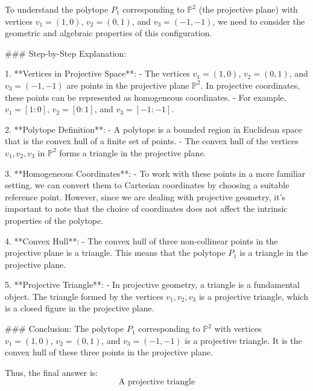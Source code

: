 To understand the polytope \( P_1 \) corresponding to \(\mathbb{P}^2\) (the projective plane) with vertices \( v_1 = (1,0) \), \( v_2 = (0,1) \), and \( v_3 = (-1,-1) \), we need to consider the geometric and algebraic properties of this configuration.

### Step-by-Step Explanation:

1. **Vertices in Projective Space**:
   - The vertices \( v_1 = (1,0) \), \( v_2 = (0,1) \), and \( v_3 = (-1,-1) \) are points in the projective plane \(\mathbb{P}^2\). In projective coordinates, these points can be represented as homogeneous coordinates.
   - For example, \( v_1 = [1:0] \), \( v_2 = [0:1] \), and \( v_3 = [-1:-1] \).

2. **Polytope Definition**:
   - A polytope is a bounded region in Euclidean space that is the convex hull of a finite set of points.
   - The convex hull of the vertices \( v_1, v_2, v_3 \) in \(\mathbb{P}^2\) forms a triangle in the projective plane.

3. **Homogeneous Coordinates**:
   - To work with these points in a more familiar setting, we can convert them to Cartesian coordinates by choosing a suitable reference point. However, since we are dealing with projective geometry, it's important to note that the choice of coordinates does not affect the intrinsic properties of the polytope.

4. **Convex Hull**:
   - The convex hull of three non-collinear points in the projective plane is a triangle. This means that the polytope \( P_1 \) is a triangle in the projective plane.

5. **Projective Triangle**:
   - In projective geometry, a triangle is a fundamental object. The triangle formed by the vertices \( v_1, v_2, v_3 \) is a projective triangle, which is a closed figure in the projective plane.

### Conclusion:
The polytope \( P_1 \) corresponding to \(\mathbb{P}^2\) with vertices \( v_1 = (1,0) \), \( v_2 = (0,1) \), and \( v_3 = (-1,-1) \) is a projective triangle. It is the convex hull of these three points in the projective plane.

Thus, the final answer is:
\[
\boxed{\text{A projective triangle}}
\]